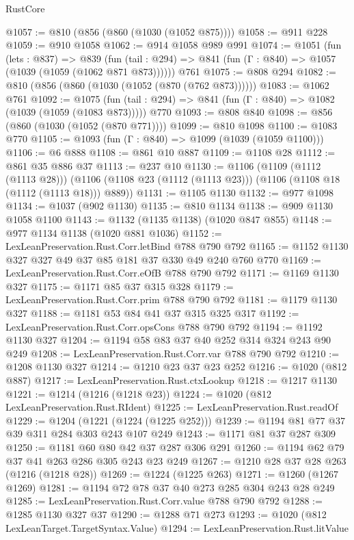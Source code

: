 \begin{lexlean}{RustCore}
\begin{coremodule}
@1057 := @810 (@856 (@860 (@1030 (@1052 @875))))
@1058 := @911 @228
@1059 := @910 @1058
@1062 := @914 @1058 @989 @991
@1074 := @1051
    (fun (lets : @837) =>
    @839 (fun (tail : @294) => @841 (fun (Γ : @840) => @1057 (@1039 (@1059 (@1062 @871 @873))))))
    @761
@1075 := @808 @294
@1082 := @810 (@856 (@860 (@1030 (@1052 (@870 (@762 @873))))))
@1083 := @1062 @761
@1092 := @1075
    (fun (tail : @294) => @841 (fun (Γ : @840) => @1082 (@1039 (@1059 (@1083 @873)))))
    @770
@1093 := @808 @840
@1098 := @856 (@860 (@1030 (@1052 (@870 @771))))
@1099 := @810 @1098
@1100 := @1083 @770
@1105 := @1093 (fun (Γ : @840) => @1099 (@1039 (@1059 @1100)))
@1106 := @6 @888
@1108 := @861 @10 @887
@1109 := @1108 @28
@1112 := @861 @35 @886 @37
@1113 := @237 @10
@1130 := @1106
    (@1109 (@1112 (@1113 @28)))
    (@1106 (@1108 @23 (@1112 (@1113 @23))) (@1106 (@1108 @18 (@1112 (@1113 @18))) @889))
@1131 := @1105 @1130
@1132 := @977 @1098
@1134 := @1037 (@902 @1130)
@1135 := @810 @1134
@1138 := @909 @1130 @1058 @1100
@1143 := @1132 (@1135 @1138) (@1020 @847 @855)
@1148 := @977 @1134 @1138 (@1020 @881 @1036)
@1152 := LexLeanPreservation.Rust.Corr.letBind @788 @790 @792
@1165 := @1152 @1130 @327 @327 @49 @37 @85 @181 @37 @330 @49 @240 @760 @770
@1169 := LexLeanPreservation.Rust.Corr.eOfB @788 @790 @792
@1171 := @1169 @1130 @327
@1175 := @1171 @85 @37 @315 @328
@1179 := LexLeanPreservation.Rust.Corr.prim @788 @790 @792
@1181 := @1179 @1130 @327
@1188 := @1181 @53 @84 @41 @37 @315 @325 @317
@1192 := LexLeanPreservation.Rust.Corr.opsCons @788 @790 @792
@1194 := @1192 @1130 @327
@1204 := @1194 @58 @83 @37 @40 @252 @314 @324 @243 @90 @249
@1208 := LexLeanPreservation.Rust.Corr.var @788 @790 @792
@1210 := @1208 @1130 @327
@1214 := @1210 @23 @37 @23 @252
@1216 := @1020 (@812 @887)
@1217 := LexLeanPreservation.Rust.ctxLookup
@1218 := @1217 @1130
@1221 := @1214 (@1216 (@1218 @23))
@1224 := @1020 (@812 LexLeanPreservation.Rust.RIdent)
@1225 := LexLeanPreservation.Rust.readOf
@1229 := @1204 (@1221 (@1224 (@1225 @252)))
@1239 := @1194 @81 @77 @37 @39 @311 @284 @303 @243 @107 @249
@1243 := @1171 @81 @37 @287 @309
@1250 := @1181 @60 @80 @42 @37 @287 @306 @291
@1260 := @1194 @62 @79 @37 @41 @263 @286 @305 @243 @23 @249
@1267 := @1210 @28 @37 @28 @263 (@1216 (@1218 @28))
@1269 := @1224 (@1225 @263)
@1271 := @1260 (@1267 @1269)
@1281 := @1194 @72 @78 @37 @40 @273 @285 @304 @243 @28 @249
@1285 := LexLeanPreservation.Rust.Corr.value @788 @790 @792
@1288 := @1285 @1130 @327 @37
@1290 := @1288 @71 @273
@1293 := @1020 (@812 LexLeanTarget.TargetSyntax.Value)
@1294 := LexLeanPreservation.Rust.litValue

\end{coremodule}
\end{lexlean}

